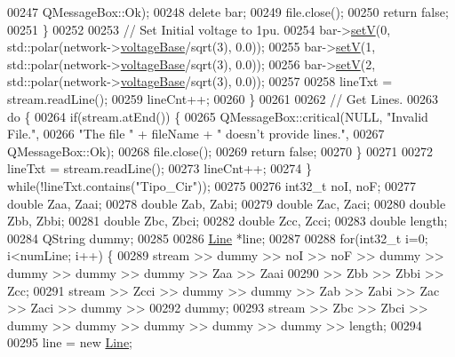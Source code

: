 \begin{DoxyCode}
00247                             QMessageBox::Ok);
00248       \textcolor{keyword}{delete} bar;
00249       file.close();
00250       \textcolor{keywordflow}{return} \textcolor{keyword}{false};
00251     \}
00252 
00253     \textcolor{comment}{// Set Initial voltage to 1pu.}
00254     bar->\hyperlink{group___models_ga9b6fbc92674bfcdc9d5090795ab335a6}{setV}(0, std::polar(network->\hyperlink{group___graphics_ga7c1e79d9ac69df9a69f24eaf092fd5e5}{voltageBase}/sqrt(3), 0.0));
00255     bar->\hyperlink{group___models_ga9b6fbc92674bfcdc9d5090795ab335a6}{setV}(1, std::polar(network->\hyperlink{group___graphics_ga7c1e79d9ac69df9a69f24eaf092fd5e5}{voltageBase}/sqrt(3), 0.0));
00256     bar->\hyperlink{group___models_ga9b6fbc92674bfcdc9d5090795ab335a6}{setV}(2, std::polar(network->\hyperlink{group___graphics_ga7c1e79d9ac69df9a69f24eaf092fd5e5}{voltageBase}/sqrt(3), 0.0));
00257 
00258     lineTxt = stream.readLine();
00259     lineCnt++;
00260   \}
00261 
00262   \textcolor{comment}{// Get Lines.}
00263   \textcolor{keywordflow}{do} \{
00264     \textcolor{keywordflow}{if}(stream.atEnd()) \{
00265       QMessageBox::critical(NULL, \textcolor{stringliteral}{"Invalid File."},
00266                             \textcolor{stringliteral}{"The file "} + fileName + \textcolor{stringliteral}{" doesn't provide lines."},
00267                             QMessageBox::Ok);
00268       file.close();
00269       \textcolor{keywordflow}{return} \textcolor{keyword}{false};
00270     \}
00271 
00272     lineTxt = stream.readLine();
00273     lineCnt++;
00274   \} \textcolor{keywordflow}{while}(!lineTxt.contains(\textcolor{stringliteral}{"Tipo\_Cir"}));
00275 
00276   int32\_t noI, noF;
00277   \textcolor{keywordtype}{double} Zaa, Zaai;
00278   \textcolor{keywordtype}{double} Zab, Zabi;
00279   \textcolor{keywordtype}{double} Zac, Zaci;
00280   \textcolor{keywordtype}{double} Zbb, Zbbi;
00281   \textcolor{keywordtype}{double} Zbc, Zbci;
00282   \textcolor{keywordtype}{double} Zcc, Zcci;
00283   \textcolor{keywordtype}{double} length;
00284   QString dummy;
00285 
00286   \hyperlink{class_line}{Line} *line;
00287 
00288   \textcolor{keywordflow}{for}(int32\_t i=0; i<numLine; i++) \{
00289     stream >> dummy >> noI >> noF >> dummy >> dummy >> dummy >> dummy >> Zaa >> Zaai
00290            >> Zbb >> Zbbi >> Zcc;
00291     stream >> Zcci >> dummy >> dummy >> Zab >> Zabi >> Zac >> Zaci >> dummy >>
00292            dummy;
00293     stream >> Zbc >> Zbci >> dummy >> dummy >> dummy >> dummy >> dummy >>   length;
00294 
00295     line = \textcolor{keyword}{new} \hyperlink{class_line}{Line};

\end{DoxyCode}

